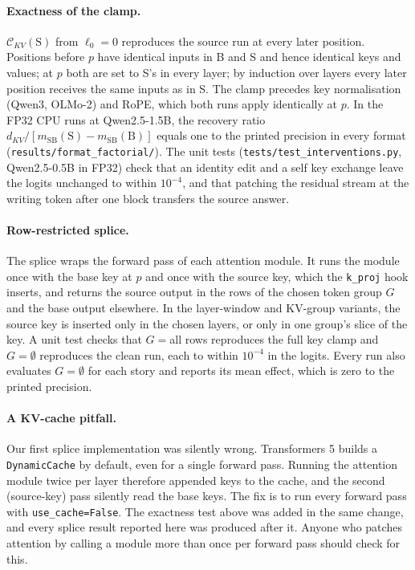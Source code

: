 \paragraph{Exactness of the clamp.} $\mathcal{C}_{KV}(\mathrm{S})$ from $\ell_0 = 0$ reproduces the source run at every later position. Positions before $p$ have identical inputs in B and S and hence identical keys and values; at $p$ both are set to S's in every layer; by induction over layers every later position receives the same inputs as in S. The clamp precedes key normalisation (Qwen3, OLMo-2) and RoPE, which both runs apply identically at $p$. In the FP32 CPU runs at Qwen2.5-1.5B, the recovery ratio $d_{KV} / [m_{\mathrm{SB}}(\mathrm{S}) - m_{\mathrm{SB}}(\mathrm{B})]$ equals one to the printed precision in every format (\texttt{results/format\_factorial/}). The unit tests (\texttt{tests/test\_interventions.py}, Qwen2.5-0.5B in FP32) check that an identity edit and a self key exchange leave the logits unchanged to within $10^{-4}$, and that patching the residual stream at the writing token after one block transfers the source answer.

\paragraph{Row-restricted splice.} The splice wraps the forward pass of each attention module. It runs the module once with the base key at $p$ and once with the source key, which the \texttt{k\_proj} hook inserts, and returns the source output in the rows of the chosen token group $G$ and the base output elsewhere. In the layer-window and KV-group variants, the source key is inserted only in the chosen layers, or only in one group's slice of the key. A unit test checks that $G = {}$all rows reproduces the full key clamp and $G = \emptyset$ reproduces the clean run, each to within $10^{-4}$ in the logits. Every run also evaluates $G = \emptyset$ for each story and reports its mean effect, which is zero to the printed precision.

\paragraph{A KV-cache pitfall.} Our first splice implementation was silently wrong. Transformers 5 builds a \texttt{DynamicCache} by default, even for a single forward pass. Running the attention module twice per layer therefore appended keys to the cache, and the second (source-key) pass silently read the base keys. The fix is to run every forward pass with \texttt{use\_cache=False}. The exactness test above was added in the same change, and every splice result reported here was produced after it. Anyone who patches attention by calling a module more than once per forward pass should check for this.

